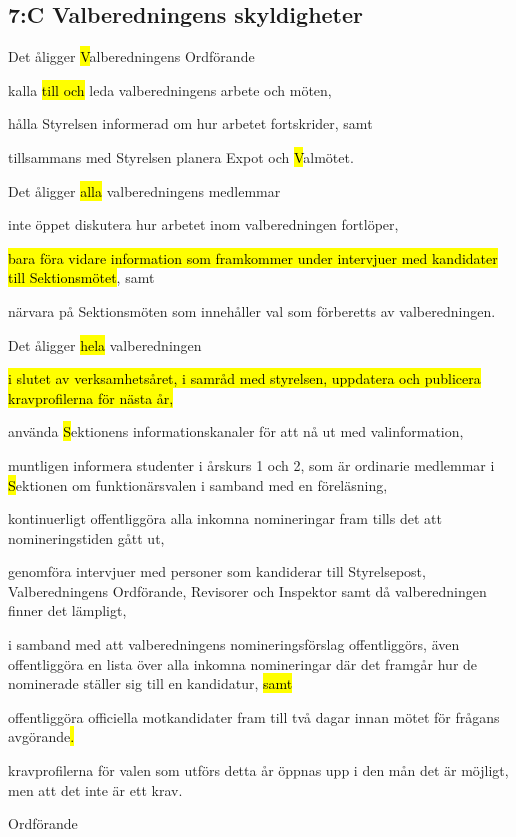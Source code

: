 \documentclass[../_main/handlingar.tex]{subfiles}
\begin{document}
\begin{attsatser}
        \subsection*{7:C Valberedningens skyldigheter}
        Det åligger \hl{V}alberedningens Ordförande
        \begin{attlist}
            \item kalla \hl{till och} leda valberedningens arbete och möten,
            \item hålla Styrelsen informerad om hur arbetet fortskrider, samt
            \item tillsammans med Styrelsen planera Expot och \hl{V}almötet.
        \end{attlist}
        Det åligger \hl{alla} valberedningens medlemmar
        \begin{attlist}
            \item inte öppet diskutera hur arbetet inom valberedningen fortlöper,
            \item \hl{bara föra vidare information som framkommer under intervjuer med kandidater till Sektionsmötet}, samt
            \item närvara på Sektionsmöten som innehåller val som förberetts av valberedningen.
        \end{attlist}
        Det åligger \hl{hela} valberedningen
        \begin{attlist}
            \item \hl{i slutet av verksamhetsåret, i samråd med styrelsen, uppdatera och publicera kravprofilerna för nästa år,}
            \item använda \hl{S}ektionens informationskanaler för att nå ut med valinformation,
            \item muntligen informera studenter i årskurs 1 och 2, som är ordinarie medlemmar i \hl{S}ektionen om funktionärsvalen i samband med en föreläsning,
            \item kontinuerligt offentliggöra alla inkomna nomineringar fram tills det att nomineringstiden gått ut,
            \item genomföra intervjuer med personer som kandiderar till Styrelsepost, Valberedningens Ordförande, Revisorer och Inspektor samt då valberedningen finner det lämpligt,
            \item i samband med att valberedningens nomineringsförslag offentliggörs, även offentliggöra en lista över alla inkomna nomineringar där det framgår hur de nominerade ställer sig till en kandidatur, \hl{samt}
            \item offentliggöra officiella motkandidater fram till två dagar innan mötet för frågans avgörande\hl{.}
        \end{attlist}

    \changenote

    \att kravprofilerna för valen som utförs detta år öppnas upp i den mån det är möjligt, men att det inte är ett krav.
\end{attsatser}

\begin{signatures}{1}
    \ist
    \signature{\ordf}{Ordförande}
\end{signatures}
\end{document}
